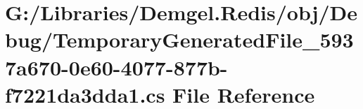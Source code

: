 \hypertarget{_debug_2_temporary_generated_file__5937a670-0e60-4077-877b-f7221da3dda1_8cs}{}\section{G\+:/\+Libraries/\+Demgel.Redis/obj/\+Debug/\+Temporary\+Generated\+File\+\_\+5937a670-\/0e60-\/4077-\/877b-\/f7221da3dda1.cs File Reference}
\label{_debug_2_temporary_generated_file__5937a670-0e60-4077-877b-f7221da3dda1_8cs}
